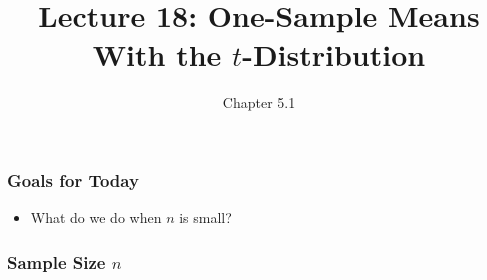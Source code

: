 \documentclass[handout]{beamer}
\title{Lecture 18: One-Sample Means With the $t$-Distribution}
\author{Chapter 5.1}
\date{}
\newcommand{\blue}[1]{\textcolor{blue2}{#1}}
\newcommand{\xbar}{\overline{x}}
\begin{document}
\begin{frame}
\titlepage
\end{frame}


\begin{frame}[fragile]
\frametitle{Goals for Today}

\begin{itemize}
\item What do we do when $n$ is small?  
\end{itemize}

\end{frame}


\begin{frame}[fragile]
\frametitle{Sample Size $n$}
%
%
%
%
%

\end{frame}


%
%
%
\end{document}

